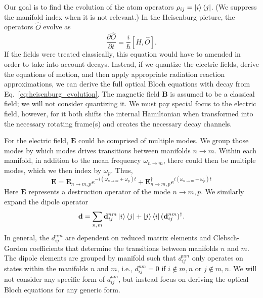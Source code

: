 \documentclass[final,5p,times,twocolumn]{elsarticle}
\begin{document}
Our goal is to find the evolution of the atom operators $\rho_{ij} = \ket{i}\Bra{j}$.  (We suppress the manifold index when it is not relevant.)  In the Heisenburg picture, the operators $\hat{O}$ evolve as
\begin{equation}
	\label{eq:heisenburg_evolution}
	\frac{\partial \hat{O}}{\partial t}  = \frac{i}{\hbar}[\hat{H}, \hat{O}].
\end{equation}
If the fields were treated classically, this equation would have to amended in order to take into account decays.  Instead, if we quantize the electric fields, derive the equations of motion, and then apply appropriate radiation reaction approximations, we can derive the full optical Bloch equations with decay from Eq.~\ref{eq:heisenburg_evolution}.  The magnetic field $\mathbf{B}$ is assumed to be a classical field; we will not consider quantizing it.  We must pay special focus to the electric field, however, for it both shifts the internal Hamiltonian when transformed into the necessary rotating frame(s) and creates the necessary decay channels.

For the electric field, $\mathbf{E}$ could be comprised of multiple modes.  We group those modes by which modes drives transitions between manifolds $n\rightarrow m$.  Within each manifold, in addition to the mean frequency $\omega_{n\rightarrow m}$, there could then be multiple modes, which we then index by $\omega_p$.  Thus,
\begin{equation}
	\mathbf{E} = \mathbf{E}_{n\rightarrow m, p} e^{-i (\omega_{n\rightarrow m} +\omega_p) t} + \mathbf{E}_{n\rightarrow m, p}^\dagger e^{i (\omega_{n\rightarrow m} +\omega_p) t}
\end{equation}
Here $\mathbf{E}$ represents a destruction operator of the mode $n\rightarrow m, p$.  We similarly expand the dipole operator
\begin{equation}
	\mathbf{d} = \sum_{n,m}\mathbf{d}^{nm}_{ij}\ket{i}\Bra{j} + \ket{j}\Bra{i}(\mathbf{d}^{nm}_{ij})^\dagger .
\end{equation}
In general, the ${d}^{nm}_{ij}$ are dependent on reduced matrix elements and Clebsch-Gordon coefficients that determine the transitions between manifolds $n$ and $m$.  The dipole elements are grouped by manifold such that $d^{nm}_{ij}$ only operates on states within the manifolds $n$ and $m$, i.e., $d^{nm}_{ij}=0$ if $i\notin m,n$ or  $j\notin m,n$.  We will not consider any specific form of $d^{nm}_{ij}$, but instead focus on deriving the optical Bloch equations for any generic form.
\end{document}

